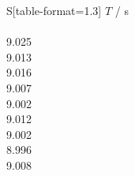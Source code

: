 \begin{subtable}{0.18\textwidth}
\centering
{}
\label{tab:magnet1-0}
\begin{tabular}{S[table-format=1.3]}
\toprule
{$T$ / s} \\
 \\
9.025 \\
9.013 \\
9.016 \\
9.007 \\
9.002 \\
9.012 \\
9.002 \\
8.996 \\
9.008 \\
\bottomrule
\end{tabular}
\end{subtable}